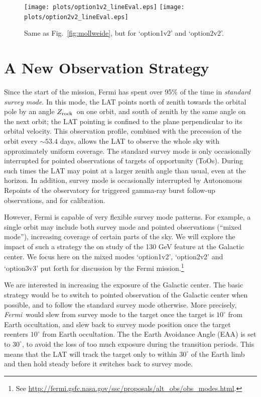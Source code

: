 \documentclass[aps,prd,superscriptaddress,nofootinbib,fixlfloat, 12pt]{revtex4-1}
\newcommand{\Fermi}{{\slshape Fermi}}
\newcommand{\zrock}{$Z_{\rm rock}$}
\begin{document}
\begin{figure}[t]
  \begin{center}
    \texttt{[image: plots/option1v2\_lineEval.eps]}
    \texttt{[image: plots/option2v2\_lineEval.eps]}
    \vspace{-0.5cm}
  \end{center}
  \caption{Same as Fig.~\ref{fig:mollweide}, but for `option1v2' and
  `option2v2'.}
  \label{fig:mollweide2}
\end{figure}

\section{A New Observation Strategy}
Since the start of the mission, Fermi has spent over 95\% of the time in
\emph{standard survey mode}.
In this mode, the LAT points north of zenith towards the orbital pole by an
angle \zrock\ on one orbit, and south of zenith by the same angle on the next
orbit; the LAT pointing is confined to the plane perpendicular to its orbital
velocity. 
This observation profile, combined with the precession of the orbit every
$\sim53.4$ days, allows the LAT to observe the whole sky with approximately
uniform coverage. The standard survey mode is only occasionally interrupted
for pointed observations of targets of opportunity (ToOs). During such times
the LAT may point at a larger zenith angle than usual, even at the horizon.  In
addition, survey mode is occasionally interrupted by Autonomous Repoints of
the observatory for triggered gamma-ray burst follow-up observations, and for
calibration.

However, Fermi is capable of very flexible survey mode patterns. For example,
a single orbit may include both survey mode and pointed observations (``mixed
mode''), increasing coverage of certain parts of the sky. We will explore the
impact of such a strategy the on study of the 130 GeV feature at the Galactic
center.  We focus here on the mixed modes `option1v2', `option2v2' and
`option3v3' put forth for discussion by the Fermi mission.\footnote{See
\url{http://fermi.gsfc.nasa.gov/ssc/proposals/alt_obs/obs_modes.html}.}

We are interested in increasing the exposure of the Galactic center.  The
basic strategy would be to switch to pointed observation of the Galactic
center when possible, and to follow the standard survey mode otherwise. More
precisely, \Fermi\ would slew from survey mode to the target once the target
is $10^\circ$ from Earth occultation, and slew back to survey mode position
once the target reenters $10^\circ$ from Earth occultation.  The
the Earth Avoidance Angle (EAA) is set to
$30^\circ$, to avoid the loss of too much exposure during the transition
periods. This means that the LAT will track the target only to within $30^\circ$ of
the Earth limb and then hold steady before it switches back to survey mode. 
\end{document}

